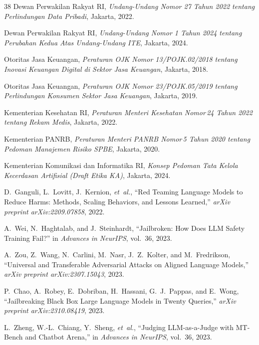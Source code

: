 \documentclass[conference]{IEEEtran}
\begin{document}
\begin{thebibliography}{38}
Dewan Perwakilan Rakyat RI, \textit{Undang-Undang Nomor 27 Tahun 2022 tentang
Perlindungan Data Pribadi}, Jakarta, 2022.

Dewan Perwakilan Rakyat RI, \textit{Undang-Undang Nomor 1 Tahun 2024 tentang
Perubahan Kedua Atas Undang-Undang ITE}, Jakarta, 2024.

Otoritas Jasa Keuangan, \textit{Peraturan OJK Nomor 13/POJK.02/2018 tentang
Inovasi Keuangan Digital di Sektor Jasa Keuangan}, Jakarta, 2018.

Otoritas Jasa Keuangan, \textit{Peraturan OJK Nomor 23/POJK.05/2019 tentang
Perlindungan Konsumen Sektor Jasa Keuangan}, Jakarta, 2019.

Kementerian Kesehatan RI, \textit{Peraturan Menteri Kesehatan Nomor\,24 Tahun
2022 tentang Rekam Medis}, Jakarta, 2022.

Kementerian PANRB, \textit{Peraturan Menteri PANRB Nomor\,5 Tahun 2020 tentang
Pedoman Manajemen Risiko SPBE}, Jakarta, 2020.

Kementerian Komunikasi dan Informatika RI, \textit{Konsep Pedoman Tata Kelola
Kecerdasan Artifisial (Draft Etika KA)}, Jakarta, 2024.

D.~Ganguli, L.~Lovitt, J.~Kernion, \textit{et~al.}, ``Red Teaming Language
Models to Reduce Harms: Methods, Scaling Behaviors, and Lessons Learned,''
\textit{arXiv preprint arXiv:2209.07858}, 2022.

A.~Wei, N.~Haghtalab, and J.~Steinhardt, ``Jailbroken: How Does LLM Safety
Training Fail?'' in \textit{Advances in NeurIPS}, vol.~36, 2023.

A.~Zou, Z.~Wang, N.~Carlini, M.~Nasr, J.~Z.~Kolter, and M.~Fredrikson,
``Universal and Transferable Adversarial Attacks on Aligned Language Models,''
\textit{arXiv preprint arXiv:2307.15043}, 2023.

P.~Chao, A.~Robey, E.~Dobriban, H.~Hassani, G.~J.~Pappas, and E.~Wong,
``Jailbreaking Black Box Large Language Models in Twenty Queries,''
\textit{arXiv preprint arXiv:2310.08419}, 2023.

L.~Zheng, W.-L.~Chiang, Y.~Sheng, \textit{et~al.}, ``Judging LLM-as-a-Judge
with MT-Bench and Chatbot Arena,'' in \textit{Advances in NeurIPS}, vol.~36,
2023.


\end{thebibliography}
\end{document}

